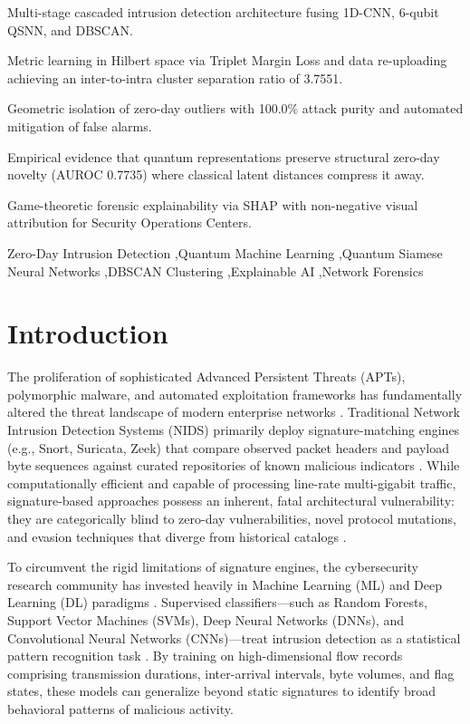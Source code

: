 \documentclass[preprint,12pt]{elsarticle}
\begin{document}
\begin{frontmatter}
\begin{highlights}
\item Multi-stage cascaded intrusion detection architecture fusing 1D-CNN, 6-qubit QSNN, and DBSCAN.
\item Metric learning in Hilbert space via Triplet Margin Loss and data re-uploading achieving an inter-to-intra cluster separation ratio of 3.7551.
\item Geometric isolation of zero-day outliers with 100.0\% attack purity and automated mitigation of false alarms.
\item Empirical evidence that quantum representations preserve structural zero-day novelty (AUROC 0.7735) where classical latent distances compress it away.
\item Game-theoretic forensic explainability via SHAP with non-negative visual attribution for Security Operations Centers.
\end{highlights}

\begin{keywords}
Zero-Day Intrusion Detection \sep Quantum Machine Learning \sep Quantum Siamese Neural Networks \sep DBSCAN Clustering \sep Explainable AI \sep Network Forensics
\end{keywords}

\end{frontmatter}

\section{Introduction}
\label{sec:intro}

The proliferation of sophisticated Advanced Persistent Threats (APTs), polymorphic malware, and automated exploitation frameworks has fundamentally altered the threat landscape of modern enterprise networks \cite{sommer2010outside, buzakova2020survey}. Traditional Network Intrusion Detection Systems (NIDS) primarily deploy signature-matching engines (e.g., Snort, Suricata, Zeek) that compare observed packet headers and payload byte sequences against curated repositories of known malicious indicators \cite{roesch1999snort}. While computationally efficient and capable of processing line-rate multi-gigabit traffic, signature-based approaches possess an inherent, fatal architectural vulnerability: they are categorically blind to zero-day vulnerabilities, novel protocol mutations, and evasion techniques that diverge from historical catalogs \cite{ahmad2021network}.

To circumvent the rigid limitations of signature engines, the cybersecurity research community has invested heavily in Machine Learning (ML) and Deep Learning (DL) paradigms \cite{shone2018deep, ferrag2020deep}. Supervised classifiers—such as Random Forests, Support Vector Machines (SVMs), Deep Neural Networks (DNNs), and Convolutional Neural Networks (CNNs)—treat intrusion detection as a statistical pattern recognition task \cite{vinayakumar2019deep}. By training on high-dimensional flow records comprising transmission durations, inter-arrival intervals, byte volumes, and flag states, these models can generalize beyond static signatures to identify broad behavioral patterns of malicious activity. 
\end{document}
